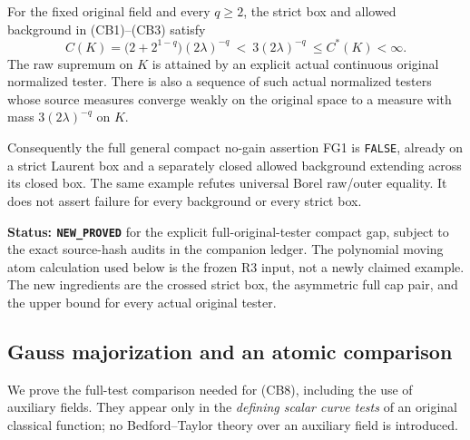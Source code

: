 \begin{theorem}
\label{thm:r16-crossed-box-compact-capacity-gap}
For the fixed original field and every $q\ge2$, the strict box
and allowed background in (CB1)--(CB3) satisfy
\[
 \boxed{\qquad
 C(K)=\bigl(2+2^{1-q}\bigr)(2\lambda)^{-q}
       \ <\ 3(2\lambda)^{-q}\ \le C^*(K)<\infty .
 \qquad}
 \tag{CB8}
\]
The raw supremum on $K$ is attained by an explicit actual
continuous original normalized tester. There is also a sequence
of such actual normalized testers whose source measures converge
weakly on the original space to a measure with mass
$3(2\lambda)^{-q}$ on $K$.

Consequently the full general compact no-gain assertion FG1 is
\texttt{FALSE}, already on a strict Laurent box and a separately
closed allowed background extending across its closed box. The
same example refutes universal Borel raw/outer equality. It does
not assert failure for every background or every strict box.
\end{theorem}

\noindent\textbf{Status: \texttt{NEW\_PROVED}} for the
explicit full-original-tester compact gap, subject to the exact
source-hash audits in the companion ledger. The polynomial moving
atom calculation used below is the frozen R3 input, not a newly
claimed example. The new ingredients are the crossed strict box,
the asymmetric full cap pair, and the upper bound for every
actual original tester.

\subsection{Gauss majorization and an atomic comparison}

We prove the full-test comparison needed for (CB8), including
the use of auxiliary fields. They appear only in the
\emph{defining scalar curve tests} of an original classical
function; no Bedford--Taylor theory over an auxiliary field is
introduced.

